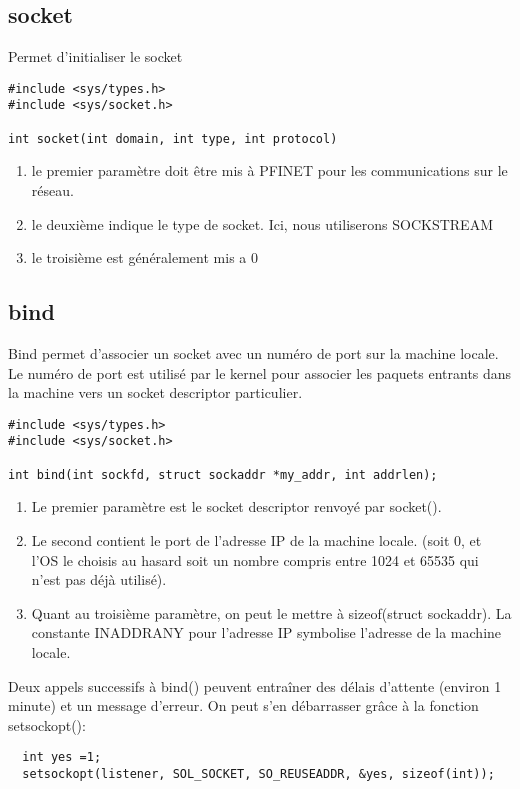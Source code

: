 \documentclass[a4paper]{article}
\begin{document}
\subsection{socket}
Permet d'initialiser le socket
\begin{lstlisting}
#include <sys/types.h>
#include <sys/socket.h>

int socket(int domain, int type, int protocol)
\end{lstlisting}
\begin{enumerate}
  \item le premier paramètre doit être mis à PF\textunderscore{}INET pour les communications sur le réseau.
  \item le deuxième indique le type de socket. Ici, nous utiliserons SOCK\textunderscore{}STREAM
  \item le troisième est généralement mis a 0
\end{enumerate}
\subsection{bind}
Bind permet d'associer un socket avec un numéro de port sur la machine locale. Le numéro de port est utilisé par le kernel pour associer les paquets entrants dans la machine vers un socket descriptor particulier.
\begin{lstlisting}
#include <sys/types.h>
#include <sys/socket.h>

int bind(int sockfd, struct sockaddr *my_addr, int addrlen);
\end{lstlisting}
\begin{enumerate}
  \item Le premier paramètre est le socket descriptor renvoyé par
socket().
  \item Le second contient le port de l'adresse IP de la machine locale. (soit 0, et l'OS le choisis au hasard soit un nombre compris entre 1024 et 65535 qui n'est pas déjà utilisé).
  \item Quant au troisième paramètre, on peut le mettre à
sizeof(struct sockaddr). La constante INADDR\textunderscore{}ANY pour l'adresse IP symbolise l'adresse de la machine locale.
\end{enumerate}
Deux appels successifs à bind() peuvent entraîner des délais d'attente (environ 1 minute) et un message d'erreur. On peut s'en débarrasser grâce à la fonction setsockopt():
\begin{lstlisting}
  int yes =1;
  setsockopt(listener, SOL_SOCKET, SO_REUSEADDR, &yes, sizeof(int));
\end{lstlisting}
\end{document}

